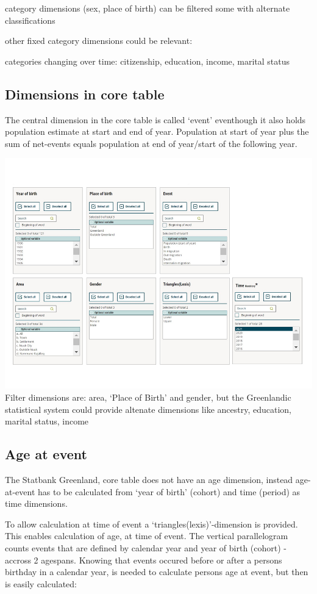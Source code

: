 \documentclass[USenglish]{article}
\begin{document}
category dimensions (sex, place of birth) can be filtered some with alternate classifications

other fixed category dimensions could be relevant: 

categories changing over time:
citizenship, education, income, marital status


\subsection{Dimensions in core table} 
The central dimension in the core table is called ‘event’ eventhough it also holds population estimate at start and end of year. Population at start of year plus the sum of net-events equals population at end of year/start of the following year.

\includegraphics[scale=0.4]{images/PopulationAccountCore}
Filter dimensions are: area, ‘Place of Birth’ and gender, but the Greenlandic statistical system could provide altenate dimensions like ancestry, education, marital status, income


\subsection{Age at event} 

The Statbank Greenland, core table does not have an age dimension, instead age-at-event has to be calculated from ‘year of birth’ (cohort) and time (period) as time dimensions.

To allow calculation at time of event a ‘triangles(lexis)’-dimension is provided. This enables calculation of age, at time of event. The vertical parallelogram counts events that are defined by calendar year and year of birth (cohort) - accross 2 agespans. Knowing that events occured before or after a persons birthday in a calendar year, is needed to calculate persons age at event, but then is easily calculated:
\end{document}
